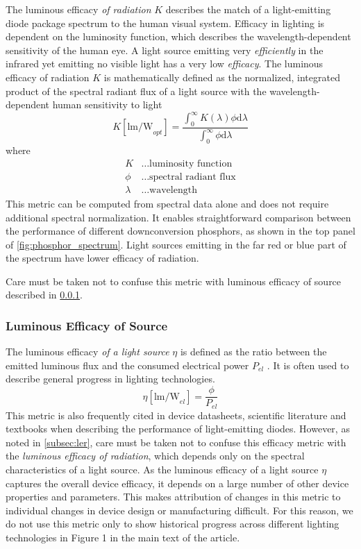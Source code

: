 \documentclass[parskip=full]{article}
\begin{document}
The luminous efficacy \textit{of radiation} $K$ describes the match of a light-emitting diode package spectrum to the human visual system. Efficacy in lighting is dependent on the luminosity function, which describes the wavelength-dependent sensitivity of the human eye. A light source emitting very \textit{efficiently} in the infrared yet emitting no visible light has a very low \textit{efficacy}. The luminous efficacy of radiation $K$ is mathematically defined as the normalized, integrated product of the spectral radiant flux of a light source with the wavelength-dependent human sensitivity to light \cite{cie-term-effrad}
%
\begin{equation}
\label{eqn:ler}
    K [\text{lm/W}_{opt}]= \frac{\int_0^\infty K( \lambda ) \phi \text{d} \lambda}{\int_0^\infty \phi \text{d} \lambda}
\end{equation}
%
where
%
\begin{align*}
    K &\dots \text{luminosity function} \\
    \phi &\dots \text{spectral radiant flux} \\
    \lambda &\dots \text{wavelength}
\end{align*}
%
This metric can be computed from spectral data alone and does not require additional spectral normalization. It enables straightforward comparison between the performance of different downconversion phosphors, as shown in the top panel of \cref{fig:phosphor_spectrum}. Light sources emitting in the far red or blue part of the spectrum have lower efficacy of radiation.

Care must be taken not to confuse this metric with luminous efficacy of source described in \cref{subsec:les}.

\subsubsection{Luminous Efficacy of Source}
\label{subsec:les}

The luminous efficacy \textit{of a light source} $\eta$ is defined as the ratio between the emitted luminous flux and the consumed electrical power $P_{el}$ \cite{cie-term-effsrc}. It is often used to describe general progress in lighting technologies.
%
\begin{equation}
    \eta [\text{lm/W}_{el}]= \frac{\phi}{P_{el}}
\end{equation}
%
This metric is also frequently cited in device datasheets, scientific literature and textbooks when describing the performance of light-emitting diodes. However, as noted in \cref{subsec:ler}, care must be taken not to confuse this efficacy metric with the \textit{luminous efficacy of radiation}, which depends only on the spectral characteristics of a light source. As the luminous efficacy of a light source $\eta$ captures the overall device efficacy, it depends on a large number of other device properties and parameters. This makes attribution of changes in this metric to individual changes in device design or manufacturing difficult. For this reason, we do not use this metric only to show historical progress across different lighting technologies in Figure 1 in the main text of the article.
\end{document}
